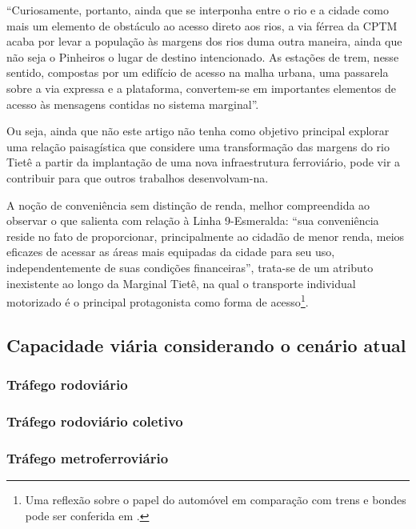 \documentclass[
article,			%
11pt,				%
oneside,			%
a4paper,			%
english,			%
brazil,				%
sumario=tradicional
]{abntex2}
\begin{document}
	\begin{citacao}
		``Curiosamente, portanto, ainda que se interponha entre o rio e a cidade como mais um elemento de obstáculo ao acesso direto aos rios, a via férrea da CPTM acaba por levar a população às margens dos rios duma outra maneira, ainda que não seja o Pinheiros o lugar de destino intencionado. As estações de trem, nesse sentido, compostas por um edifício de acesso na malha urbana, uma passarela sobre a via expressa e a plataforma, convertem-se em importantes elementos de acesso às mensagens contidas no sistema marginal''.
	\end{citacao}
	
	Ou seja, ainda que não este artigo não tenha como objetivo principal explorar uma relação paisagística que considere uma transformação das margens do rio Tietê a partir da implantação de uma nova infraestrutura ferroviário, pode vir a contribuir para que outros trabalhos desenvolvam-na.
	
	A noção de conveniência sem distinção de renda, melhor compreendida ao observar o que  salienta com relação à Linha 9-Esmeralda: ``sua conveniência reside no fato de proporcionar, principalmente ao cidadão de menor renda, meios eficazes de acessar as áreas mais equipadas da cidade para seu uso, independentemente de suas condições financeiras'', trata-se de um atributo inexistente ao longo da Marginal Tietê, na qual o transporte individual motorizado é o principal protagonista como forma de acesso\footnote{Uma reflexão sobre o papel do automóvel em comparação com trens e bondes pode ser conferida em .}.
	
	\subsection{Capacidade viária considerando o cenário atual} \label{s2:capacidadeatual}
	
	\subsubsection{Tráfego rodoviário} \label{s3:rodoatual}
	
	\subsubsection{Tráfego rodoviário coletivo} \label{s3:coletivoatual}
	
	\subsubsection{Tráfego metroferroviário} \label{s3:metroatual}
	
\end{document}
